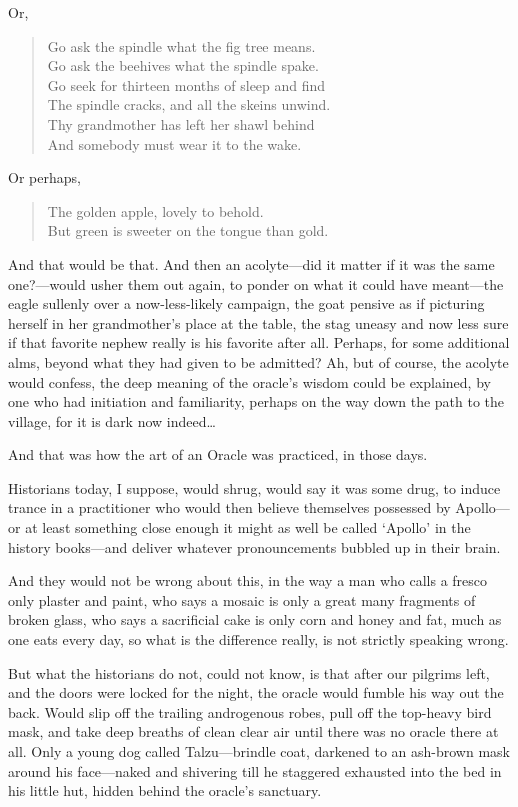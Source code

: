 Or,

\begin{verse}
Go ask the spindle what the fig tree means. \\
Go ask the beehives what the spindle spake. \\
Go seek for thirteen months of sleep and find \\
The spindle cracks, and all the skeins unwind. \\
Thy grandmother has left her shawl behind \\
And somebody must wear it to the wake.
\end{verse}

Or perhaps,

\begin{verse}
The golden apple, lovely to behold.\\
But green is sweeter on the tongue than gold.
\end{verse}

And that would be that. And then an acolyte---did it matter if it was the same one?---would usher them out again, to ponder on what it could have meant---the eagle sullenly over a now-less-likely campaign, the goat pensive as if picturing herself in her grandmother's place at the table, the stag uneasy and now less sure if that favorite nephew really is his favorite after all. Perhaps, for some additional alms, beyond what they had given to be admitted? Ah, but of course, the acolyte would confess, the deep meaning of the oracle's wisdom could be explained, by one who had initiation and familiarity, perhaps on the way down the path to the village, for it is dark now indeed\ldots{}

And that was how the art of an Oracle was practiced, in those days.

Historians today, I suppose, would shrug, would say it was some drug, to induce trance in a practitioner who would then believe themselves possessed by Apollo---or at least something close enough it might as well be called `Apollo' in the history books---and deliver whatever pronouncements bubbled up in their brain.

And they would not be wrong about this, in the way a man who calls a fresco only plaster and paint, who says a mosaic is only a great many fragments of broken glass, who says a sacrificial cake is only corn and honey and fat, much as one eats every day, so what is the difference really, is not strictly speaking wrong.

But what the historians do not, could not know, is that after our pilgrims left, and the doors were locked for the night, the oracle would fumble his way out the back. Would slip off the trailing androgenous robes, pull off the top-heavy bird mask, and take deep breaths of clean clear air until there was no oracle there at all. Only a young dog called Talzu---brindle coat, darkened to an ash-brown mask around his face---naked and shivering till he staggered exhausted into the bed in his little hut, hidden behind the oracle's sanctuary.

